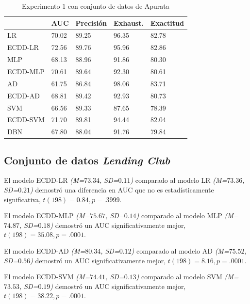 \begin{table}[htbp]
\centering
\caption{Experimento 1 con conjunto de datos de Apurata}
\label{tab:apurata-proc1}
\begin{tabularx}{0.75\textwidth}{|l|Y Y Y Y|}
				\hline
				& AUC		& Precisión	& Exhaust.		& Exactitud	\\
				\hline
LR				& 70.02		& 89.25		& 96.35			& 82.78		\\		%
ECDD-LR			& 72.56		& 89.76		& 95.96			& 82.86		\\		%
				\hline
MLP				& 68.13		& 88.96		& 91.86			& 80.30		\\		%
ECDD-MLP		& 70.61		& 89.64		& 92.30			& 80.61		\\		%
				\hline
AD				& 61.75		& 86.84		& 98.06			& 83.71		\\		%
ECDD-AD			& 68.81		& 89.42		& 92.93			& 80.73		\\		%
				\hline
SVM				& 66.56		& 89.33		& 87.65			& 78.39		\\		%
ECDD-SVM		& 71.70		& 89.81		& 94.44			& 82.04		\\		%
				\hline
DBN				& 67.80		& 88.04		& 91.76			& 79.84		\\		%
				\hline
\end{tabularx}
\end{table}


\subsection{Conjunto de datos \textit{Lending Club}}

El modelo ECDD-LR \textit{(M=$73.34$, SD=$0.11$)} comparado al modelo \ac{LR} \textit{(M=$73.36$, SD=$0.21$)} demostró una diferencia en \ac{AUC} que no es estadísticamente significativa, $t(198)=0.84, p=.3999$.

El modelo ECDD-MLP \textit{(M=$75.67$, SD=$0.14$)} comparado al modelo \ac{MLP} \textit{(M=$74.87$, SD=$0.18$)} demostró un \ac{AUC} significativamente mejor, $t(198)=35.08, p=.0001$.

El modelo ECDD-AD \textit{(M=$80.34$, SD=$0.12$)} comparado al modelo \ac{AD} \textit{(M=$75.52$, SD=$0.56$)} demostró un \ac{AUC} significativamente mejor, $t(198)=8.16, p=.0001$.

El modelo ECDD-SVM \textit{(M=$74.41$, SD=$0.13$)} comparado al modelo \ac{SVM} \textit{(M=$73.53$, SD=$0.19$)} demostró un \ac{AUC} significativamente mejor, $t(198)=38.22, p=.0001$.

